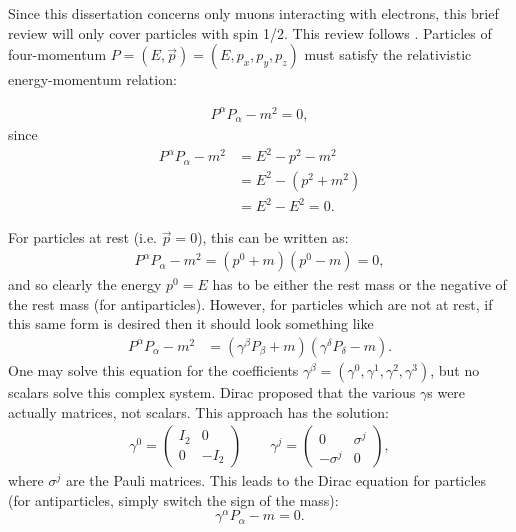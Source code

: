  \label{apx:particlePhysicsReview}

Since this dissertation concerns only muons interacting with electrons, this
brief review will only cover particles with spin 1/2. This review follows
\cite{griffithspp}.
Particles of four-momentum $P=(E, \vec{p})=(E,p_x,p_y,p_z)$ must satisfy the
relativistic
energy-momentum relation:

\begin{gather} \label{eqn:energyMomentumRelation}
P^{\alpha}P_\alpha - m^2 = 0,
\end{gather}
since
\begin{align*}
P^{\alpha}P_\alpha - m^2&=E^2-p^2-m^2 \\ &=E^2-(p^2+m^2) \\ &=E^2-E^2=0.
\end{align*}

For particles at rest (i.e. $\vec{p}=0$), this can be written as:
\begin{align*}
P^\alpha P_\alpha - m^2 = (p^0+m)(p^0-m)=0,
\end{align*}
and so clearly the energy $p^0=E$ has to be either the rest mass or the negative
of the rest mass
(for antiparticles). However, for particles which are not at rest, if this same
form is desired
then it should look something like
\begin{align*}
P^\alpha P_\alpha - m^2 &= (\gamma^\beta P_\beta + m)(\gamma^\delta P_\delta
-m).
\end{align*}
One may solve this equation for the coefficients
$\gamma^\beta=(\gamma^0,\gamma^1,\gamma^2,\gamma^3)$, but no scalars solve this
complex system.
Dirac proposed that the various $\gamma$s were actually matrices, not scalars.
This approach has the solution:
\begin{align*}
\gamma^0=
\begin{pmatrix}
I_2 & 0\\
0 & -I_2
\end{pmatrix} \qquad \gamma^j=
\begin{pmatrix}
0 & \sigma^j\\
-\sigma^j & 0
\end{pmatrix},
\end{align*}
where $\sigma^j$ are the Pauli matrices. This leads to the Dirac equation for
particles (for
antiparticles, simply switch the sign of the mass):
\begin{equation}\label{eqn:diracEquation}
\gamma^\alpha P_\alpha - m = 0.
\end{equation}

